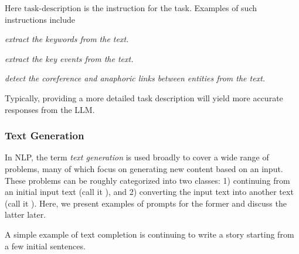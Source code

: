 \noindent Here $\mathrm{task\textrm{-}description}$ is the instruction for the task. Examples of such instructions include

\vspace{0.3em}
\hspace{2em} \textit{extract the keywords from the text.}

\vspace{0.3em}
\hspace{2em} \textit{extract the key events from the text.}

\vspace{0.3em}
\hspace{2em} \textit{detect the coreference and anaphoric links between entities from the text.}

\vspace{0.3em}

\noindent Typically, providing a more detailed task description will yield more accurate responses from the LLM.

\subsubsection{Text Generation}

\noindent In NLP, the term \textit{text generation} is used broadly to cover a wide range of problems, many of which focus on generating new content based on an input. These problems can be roughly categorized into two classes: 1) continuing from an initial input text (call it ), and 2) converting the input text into another text (call it ). Here, we present examples of prompts for the former and discuss the latter later.

A simple example of text completion is continuing to write a story starting from a few initial sentences.

